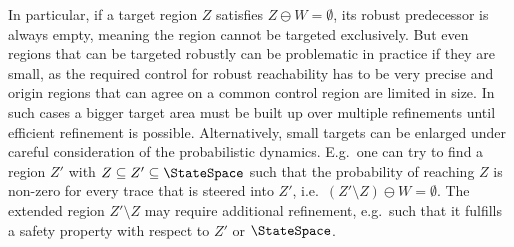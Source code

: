     In particular, if a target region $Z$ satisfies $Z \ominus W = \emptyset$, its robust predecessor is always empty, meaning the region cannot be targeted exclusively.
    But even regions that can be targeted robustly can be problematic in practice if they are small, as the required control for robust reachability has to be very precise and origin regions that can agree on a common control region are limited in size.
    In such cases a bigger target area must be built up over multiple refinements until efficient refinement is possible.
    Alternatively, small targets can be enlarged under careful consideration of the probabilistic dynamics.
    E.g.\ one can try to find a region $Z'$ with $Z \subseteq Z' \subseteq \StateSpace$ such that the probability of reaching $Z$ is non-zero for every trace that is steered into $Z'$, i.e.\ $(Z' \setminus Z) \ominus W = \emptyset$.
    The extended region $Z' \setminus Z$ may require additional refinement, e.g.\ such that it fulfills a safety property with respect to $Z'$ or $\StateSpace$.

\stopsubsection

